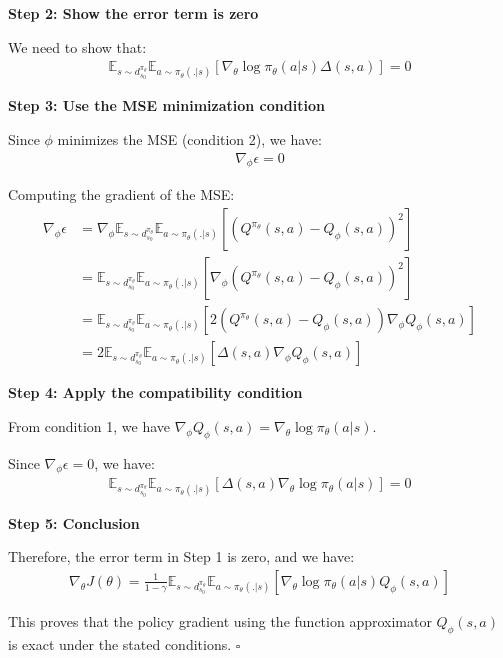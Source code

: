 \textbf{Step 2: Show the error term is zero}

We need to show that:
\begin{align}
\mathbb{E}_{s \sim d^{\pi_\theta}_{s_0}}\mathbb{E}_{a \sim \pi_\theta(.|s)} [\nabla_\theta \log \pi_\theta (a|s) \Delta(s,a)] = 0
\end{align}

\textbf{Step 3: Use the MSE minimization condition}

Since $\phi$ minimizes the MSE (condition 2), we have:
\begin{align}
\nabla_\phi \epsilon = 0
\end{align}

Computing the gradient of the MSE:
\begin{align}
\nabla_\phi \epsilon &= \nabla_\phi \mathbb{E}_{s \sim d^{\pi_\theta}_{s_0}}\mathbb{E}_{a \sim \pi_\theta(.|s)} [(Q^{\pi_\theta} (s, a) - Q_\phi(s, a))^2] \\
&= \mathbb{E}_{s \sim d^{\pi_\theta}_{s_0}}\mathbb{E}_{a \sim \pi_\theta(.|s)} [\nabla_\phi (Q^{\pi_\theta} (s, a) - Q_\phi(s, a))^2] \\
&= \mathbb{E}_{s \sim d^{\pi_\theta}_{s_0}}\mathbb{E}_{a \sim \pi_\theta(.|s)} [2(Q^{\pi_\theta} (s, a) - Q_\phi(s, a)) \nabla_\phi Q_\phi(s, a)] \\
&= 2\mathbb{E}_{s \sim d^{\pi_\theta}_{s_0}}\mathbb{E}_{a \sim \pi_\theta(.|s)} [\Delta(s,a) \nabla_\phi Q_\phi(s, a)]
\end{align}

\textbf{Step 4: Apply the compatibility condition}

From condition 1, we have $\nabla_{\phi} Q_\phi(s, a) = \nabla_\theta \log \pi_\theta (a|s)$.

Since $\nabla_\phi \epsilon = 0$, we have:
\begin{align}
\mathbb{E}_{s \sim d^{\pi_\theta}_{s_0}}\mathbb{E}_{a \sim \pi_\theta(.|s)} [\Delta(s,a) \nabla_\theta \log \pi_\theta (a|s)] = 0
\end{align}

\textbf{Step 5: Conclusion}

Therefore, the error term in Step 1 is zero, and we have:
\begin{align}
\nabla_\theta J(\theta) = \frac{1}{1-\gamma}\mathbb{E}_{s \sim d^{\pi_\theta}_{s_0}}\mathbb{E}_{a \sim \pi_\theta(.|s)} [\nabla_\theta \log \pi_\theta (a|s) Q_\phi (s, a)]
\end{align}

This proves that the policy gradient using the function approximator $Q_\phi(s,a)$ is exact under the stated conditions. $\square$

